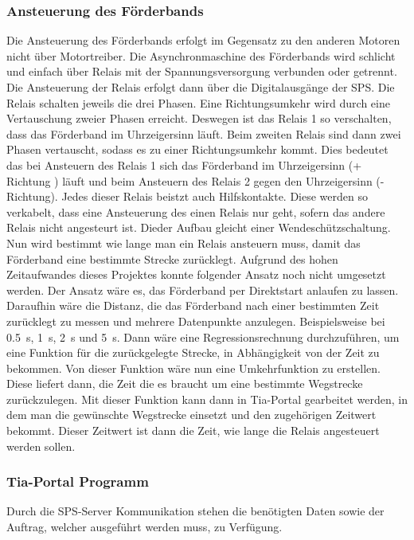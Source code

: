\subsubsection{Ansteuerung des Förderbands}
\label{Ansteuerung des Förderbandes}
Die Ansteuerung des Förderbands erfolgt im Gegensatz zu den anderen Motoren nicht über Motortreiber. Die Asynchronmaschine des Förderbands wird schlicht und einfach über Relais mit der Spannungsversorgung verbunden oder getrennt. Die Ansteuerung der Relais erfolgt dann über die Digitalausgänge der SPS. Die Relais schalten jeweils die drei Phasen. Eine Richtungsumkehr wird durch eine Vertauschung zweier Phasen erreicht. Deswegen ist das Relais 1 so verschalten, dass das Förderband im Uhrzeigersinn läuft. Beim zweiten Relais sind dann zwei Phasen vertauscht, sodass es zu einer Richtungsumkehr kommt. Dies bedeutet das bei Ansteuern des Relais 1 sich das Förderband im Uhrzeigersinn (+ Richtung ) läuft und beim Ansteuern des  Relais 2 gegen den Uhrzeigersinn (- Richtung). Jedes dieser Relais beistzt auch Hilfskontakte. Diese werden so verkabelt, dass eine Ansteuerung des einen Relais nur geht, sofern das andere Relais nicht angesteurt ist. Dieder Aufbau gleicht einer Wendeschützschaltung. \\
Nun wird bestimmt wie lange man ein Relais ansteuern muss, damit das Förderband eine bestimmte Strecke zurücklegt. Aufgrund des hohen Zeitaufwandes dieses Projektes konnte folgender Ansatz noch nicht umgesetzt werden. Der Ansatz wäre es, das Förderband per Direktstart anlaufen zu lassen. Daraufhin wäre die Distanz, die das Förderband nach einer bestimmten Zeit zurücklegt zu messen und mehrere Datenpunkte anzulegen. Beispielsweise bei \qty{0.5}{\second}, \qty{1}{\second}, \qty{2}{\second} und \qty{5}{\second}. Dann wäre eine Regressionsrechnung durchzuführen, um eine Funktion für die zurückgelegte Strecke, in Abhängigkeit von der Zeit zu bekommen. Von dieser Funktion wäre nun eine Umkehrfunktion zu erstellen. Diese liefert dann, die Zeit die es braucht um eine bestimmte Wegstrecke zurückzulegen. Mit dieser Funktion kann dann in Tia-Portal gearbeitet werden, in dem man die gewünschte Wegstrecke einsetzt und den zugehörigen Zeitwert bekommt. Dieser Zeitwert ist dann die Zeit, wie lange die Relais angesteuert werden sollen. 

\subsubsection{Tia-Portal Programm}
Durch die SPS-Server Kommunikation stehen die benötigten Daten sowie der Auftrag, welcher ausgeführt werden muss, zu Verfügung. 


